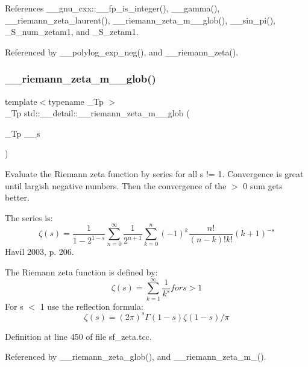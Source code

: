 References \+\_\+\+\_\+gnu\+\_\+cxx\+::\+\_\+\+\_\+fp\+\_\+is\+\_\+integer(), \+\_\+\+\_\+gamma(), \+\_\+\+\_\+riemann\+\_\+zeta\+\_\+laurent(), \+\_\+\+\_\+riemann\+\_\+zeta\+\_\+m\+\_\+\_\+glob(), \+\_\+\+\_\+sin\+\_\+pi(), \+\_\+\+S\+\_\+num\+\_\+zetam1, and \+\_\+\+S\+\_\+zetam1.



Referenced by \+\_\+\+\_\+polylog\+\_\+exp\+\_\+neg(), and \+\_\+\+\_\+riemann\+\_\+zeta().

\mbox{\label{namespacestd_1_1____detail_ac7a15aa2658fef76642cebd7858fa0ff}} 
\subsubsection{\texorpdfstring{\+\_\+\+\_\+riemann\+\_\+zeta\+\_\+m\+\_\+\_\+glob()}{\_\_riemann\_zeta\_m\_1\_glob()}}
{\footnotesize\ttfamily template$<$typename \+\_\+\+Tp $>$ \\
\+\_\+\+Tp std\+::\+\_\+\+\_\+detail\+::\+\_\+\+\_\+riemann\+\_\+zeta\+\_\+m\+\_\+\_\+glob (\begin{DoxyParamCaption}\item[{\+\_\+\+Tp}]{\+\_\+\+\_\+s }\end{DoxyParamCaption})}



Evaluate the Riemann zeta function by series for all s != 1. Convergence is great until largish negative numbers. Then the convergence of the $>$ 0 sum gets better. 

The series is\+: \[ \zeta(s) = \frac{1}{1-2^{1-s}} \sum_{n=0}^{\infty} \frac{1}{2^{n+1}} \sum_{k=0}^{n} (-1)^k \frac{n!}{(n-k)!k!} (k+1)^{-s} \] Havil 2003, p. 206.

The Riemann zeta function is defined by\+: \[ \zeta(s) = \sum_{k=1}^{\infty} \frac{1}{k^{s}} for s > 1 \] For s $<$ 1 use the reflection formula\+: \[ \zeta(s) = (2\pi)^s \Gamma(1-s) \zeta(1-s) / \pi \] 

Definition at line 450 of file sf\+\_\+zeta.\+tcc.



Referenced by \+\_\+\+\_\+riemann\+\_\+zeta\+\_\+glob(), and \+\_\+\+\_\+riemann\+\_\+zeta\+\_\+m\+\_().


